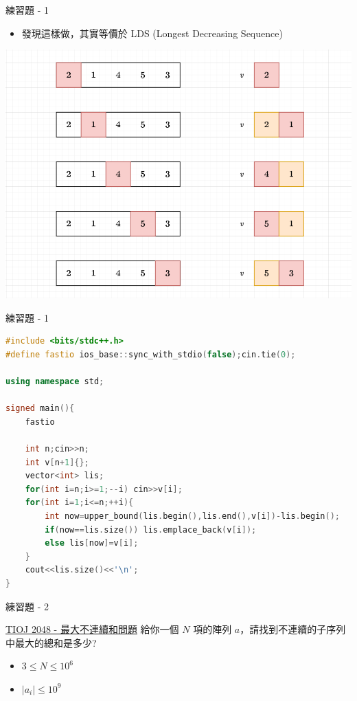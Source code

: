 \documentclass[aspectratio=169]{beamer}
\begin{document}
    \begin{frame}{練習題 - 1}
        \begin{itemize}
            \item 發現這樣做，其實等價於 LDS (Longest Decreasing Sequence)
        \end{itemize}
        \begin{center}
            \includegraphics[scale=0.25]{images/ABC134E_LDS.png}
        \end{center}
    \end{frame}

    \begin{frame}[fragile]{練習題 - 1}
        \begin{lstlisting}[language=C++, basicstyle=\ttfamily\tiny]
#include <bits/stdc++.h>
#define fastio ios_base::sync_with_stdio(false);cin.tie(0);

using namespace std;

signed main(){
    fastio

    int n;cin>>n;
    int v[n+1]{};
    vector<int> lis;
    for(int i=n;i>=1;--i) cin>>v[i];
    for(int i=1;i<=n;++i){
        int now=upper_bound(lis.begin(),lis.end(),v[i])-lis.begin();
        if(now==lis.size()) lis.emplace_back(v[i]);
        else lis[now]=v[i];
    }
    cout<<lis.size()<<'\n';
}
        \end{lstlisting}
    \end{frame}

    \begin{frame}{練習題 - 2}
        \begin{block}{\href{https://tioj.ck.tp.edu.tw/problems/2048}{TIOJ 2048 - 最大不連續和問題}}
            給你一個 $N$ 項的陣列 $a$，請找到不連續的子序列中最大的總和是多少?
            \begin{itemize}
                \item $3 \le N \le 10^6$
                \item $|a_i| \le 10^9$
            \end{itemize}
        \end{block}
    \end{frame}
\end{document}
